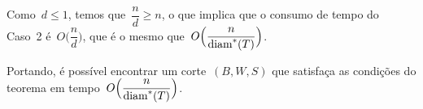 	Como~$d\le1$, temos que~$\dfrac{n}{d}\ge n$, o que implica que o
	consumo de tempo do Caso~2 é~$O\Big(\dfrac{n}{d}\Big)$, que 
	é o mesmo que~$O\Big(\dfrac{n}{\mathrm{diam}^*(T)}\Big)$.

	Portando, é possível encontrar um corte~$(B,W,S)$
	que satisfaça as condições do teorema em 
	tempo~$O\Big(\dfrac{n}{\mathrm{diam}^*(T)}\Big)$.






	\bigskip
	\bigskip
